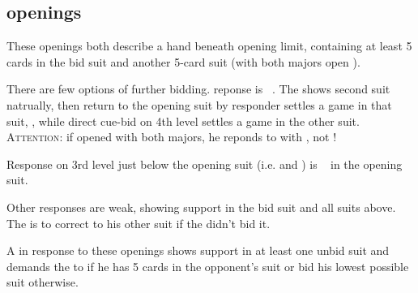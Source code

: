 \subsection{\ctr{2\protect\major} openings}
\label{subsec:2maj-op}

These openings both describe a hand beneath opening limit, containing at least 5 cards in the bid suit and another
5-card suit (with both majors open \ctr{2\h}). \vspace{1em}

There are few options of further bidding. \ctr{2\nt} reponse is \gf\ . The \opn shows second
suit natrually, then return to the opening suit by responder settles a game in that suit, , while direct
cue-bid on 4th level settles a game in the other suit. \textsc{Attention}: if \opn\/ opened \ctr{2\h} with both majors,
he reponds to \ctr{2\nt} with \ctr{3\h}, not \ctr{3\s}! \vspace{1em}

Response on 3rd level just below the opening suit (i.e. \sequence{\ctr{2\h} -- \ctr{3\d}} and \sequence{\ctr{2\s} --
\ctr{3\h}}) is \inv\ \ws{} in the opening suit. \vspace{1em}

Other responses are weak, \nat\/ showing support in the bid suit and all suits above. The \opn is to correct to his
other suit if the \resp didn't bid it. \vspace{1em}

A \dbl\/ in response to these openings shows support in at least one unbid suit and demands the \opn\/ to \pass\/ if he
has 5 cards in the opponent's suit or bid his lowest possible suit otherwise.
